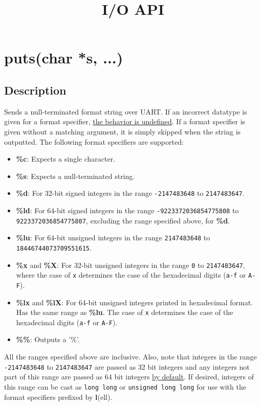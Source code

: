 \documentclass{article}
\title{I/O API}
\date{}
\begin{document}
\maketitle

\section*{puts(char *s, ...)}
\subsection*{Description}
Sends a null-terminated format string over UART. If an incorrect datatype is given for a format specifier, \underline{the behavior is undefined}. If a format specifier is given without a matching argument, it is simply skipped when the string is outputted. The following format specifiers are supported:

\begin{itemize}
  \item \textbf{\%c}: Expects a single character.
  \item \textbf{\%s}: Expects a null-terminated string.
  \item \textbf{\%d}: For 32-bit signed integers in the range \texttt{-2147483648} to \texttt{2147483647}.
  \item \textbf{\%ld}: For 64-bit signed integers in the range \texttt{-9223372036854775808} to \texttt{9223372036854775807}, excluding the range specified above, for \textbf{\%d}.
  \item \textbf{\%lu}: For 64-bit unsigned integers in the range \texttt{2147483648} to \texttt{18446744073709551615}.
  \item \textbf{\%x} and \textbf{\%X}: For 32-bit unsigned integers in the range \texttt{0} to \texttt{2147483647}, where the case of \texttt{x} determines the case of the hexadecimal digits (\texttt{a-f} or \texttt{A-F}).
  \item \textbf{\%lx} and \textbf{\%lX}: For 64-bit unsigned integers printed in hexadecimal format. Has the same range as \textbf{\%lu}. The case of \texttt{x} determines the case of the hexadecimal digits (\texttt{a-f} or \texttt{A-F}).
  \item \textbf{\%\%}: Outputs a '\%'.
\end{itemize}

\begin{flushleft}
All the ranges specified above are inclusive. Also, note that integers in the range \texttt{-2147483648} to \texttt{2147483647} are passed as 32 bit integers and any integers not part of this range are passed as 64 bit integers \underline{by default}.
If desired, integers of this range can be cast as \texttt{long long} or \texttt{unsigned long long}
\newline
for use with the format specifiers prefixed by \textbf{l}(ell).
\end{flushleft}
\end{document}
